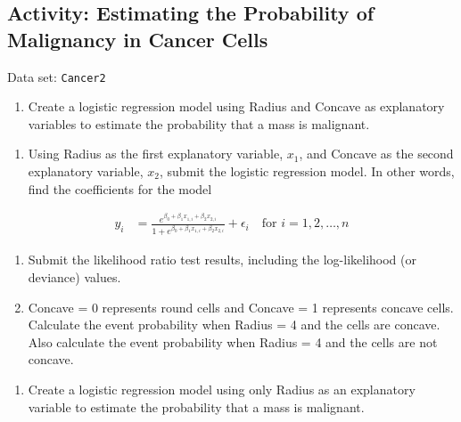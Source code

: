 \documentclass[
]{book}
\providecommand{\tightlist}{%
  \setlength{\itemsep}{0pt}\setlength{\parskip}{0pt}}
\begin{document}
\hypertarget{activity-estimating-the-probability-of-malignancy-in-cancer-cells}{%
\subsection*{Activity: Estimating the Probability of Malignancy in Cancer Cells}\label{activity-estimating-the-probability-of-malignancy-in-cancer-cells}}

Data set: \texttt{Cancer2}

\begin{enumerate}
\def\labelenumi{\arabic{enumi}.}
\setcounter{enumi}{14}
\tightlist
\item
  Create a logistic regression model using Radius and Concave as explanatory variables to estimate the probability that a mass is malignant.\\
\end{enumerate}

\begin{enumerate}
\def\labelenumi{\alph{enumi}.}
\tightlist
\item
  Using Radius as the first explanatory variable, \(x_1\), and Concave as the second explanatory variable, \(x_2\), submit the logistic regression model. In other words, find the coefficients for the model
\end{enumerate}

\begin{align}
   y_i &= \frac{e^{\beta_0 + \beta_1 x_{1,i} + \beta_2 x_{2,i}}}{1 + e^{\beta_0 + \beta_1 x_{1,i} + \beta_2 x_{2,i}}} + \epsilon_i \quad \text{for } i = 1,2,\dots,n
\end{align}

\begin{enumerate}
\def\labelenumi{\alph{enumi}.}
\setcounter{enumi}{1}
\tightlist
\item
  Submit the likelihood ratio test results, including the log-likelihood (or deviance) values.\\
\item
  Concave = 0 represents round cells and Concave = 1 represents concave cells. Calculate the event probability when Radius = 4 and the cells are concave. Also calculate the event probability when Radius = 4 and the cells are not concave.
\end{enumerate}

\begin{enumerate}
\def\labelenumi{\arabic{enumi}.}
\setcounter{enumi}{15}
\tightlist
\item
  Create a logistic regression model using only Radius as an explanatory variable to estimate the probability that a mass is malignant.\\
\end{enumerate}
\end{document}
